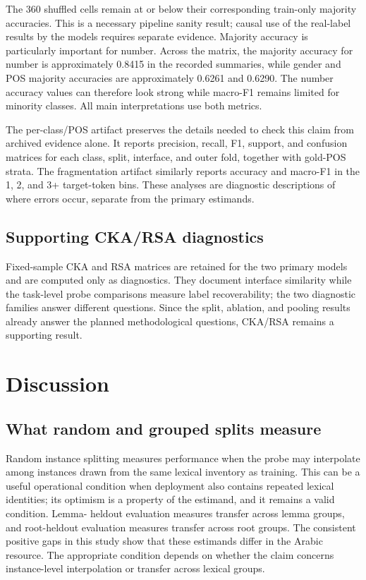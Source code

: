 \documentclass[pdflatex,sn-basic]{sn-jnl}
\begin{document}
The 360 shuffled cells remain at or below their corresponding train-only
majority accuracies. This is a necessary pipeline sanity result; causal use of
the real-label results by the models requires separate evidence. Majority accuracy
is particularly important for number. Across the matrix, the majority
accuracy for number is approximately 0.8415 in the recorded summaries, while
gender and POS majority accuracies are approximately 0.6261 and 0.6290.
The number accuracy values can therefore look strong while macro-F1 remains
limited for minority classes. All main interpretations use both metrics.

The per-class/POS artifact preserves the details needed to check this claim
from archived evidence alone. It reports precision, recall, F1, support, and
confusion matrices for each class, split, interface, and outer fold, together
with gold-POS strata. The fragmentation artifact similarly reports accuracy
and macro-F1 in the 1, 2, and 3+ target-token bins. These analyses are
diagnostic descriptions of where errors occur, separate from the primary
estimands.

\subsection{Supporting CKA/RSA diagnostics}

Fixed-sample CKA and RSA matrices are retained for the two primary models and
are computed only as diagnostics. They document interface similarity while
the task-level probe comparisons measure label recoverability; the two
diagnostic families answer different questions. Since the split, ablation, and
pooling results already answer the planned methodological questions, CKA/RSA
remains a supporting result.

\section{Discussion}

\subsection{What random and grouped splits measure}

Random instance splitting measures performance when the probe may interpolate
among instances drawn from the same lexical inventory as training. This can be
a useful operational condition when deployment also contains repeated lexical
identities; its optimism is a property of the estimand, and it remains a valid
condition. Lemma-
heldout evaluation measures transfer across lemma groups, and
root-heldout evaluation measures transfer across root groups. The consistent
positive gaps in this study show that these estimands differ in the Arabic
resource. The appropriate condition depends on whether the claim concerns
instance-level interpolation or transfer across lexical groups.
\end{document}
